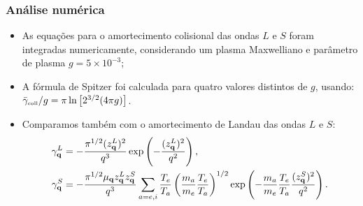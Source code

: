 \documentclass[10pt,aspectratio=1610,lualatex]{beamer}
\begin{document}
\begin{frame}
  \frametitle{Análise numérica}
  \begin{itemize}
    \item As equações para o amortecimento colisional das ondas $L$
    e $S$ foram integradas numericamente, considerando um plasma
    Maxwelliano e parâmetro de plasma $g=5\times 10^{-3}$;
    \vspace{0.25cm}
    \pause
    \item A fórmula de Spitzer foi calculada para quatro valores
      distintos de $g$, usando: $\bar \gamma_{\mbox{\tiny coll}}/g
      = \pi \ln \left[2^{3/2}(4\pi g)\right]$.
      \item Comparamos também com o amortecimento de Landau
    das ondas $L$ e $S$:
    \begin{align*}
       \gamma_{\bf q}^L
      &= -\frac{\pi^{1/2}(z_{\bf q}^L)^2}{q^3}
	  \exp\left(-\frac{(z_{\bf q}^L)^2}{q^2}\right),\\
      \gamma_{\bf q}^S
      &= -\frac{\pi^{1/2}\mu_{\bf q}z_{\bf q}^Lz_{\bf q}^S}{q^3}
	  \sum_{a=e,i}\frac{T_e}{T_a}\left(\frac{m_a}{m_e}
	  \frac{T_e}{T_a}\right)^{1/2}\exp\left(-\frac{m_a}{m_e}
	  \frac{T_e}{T_a}\frac{(z_{\bf q}^S)^2}{q^2}\right).
    \end{align*}
  \end{itemize}
\end{frame}
\end{document}
